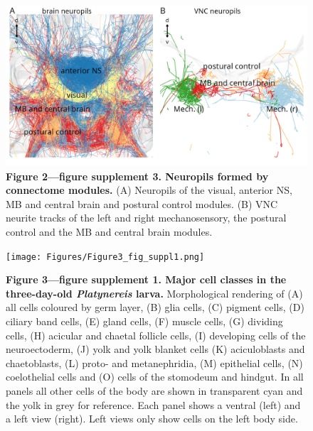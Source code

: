 \documentclass[
  11pt,
]{article}
\begin{document}
\begin{figure}[H]

{\centering \includegraphics[width=1\textwidth,height=\textheight]{Figures/Figure2_fig_suppl3.png}

}

\caption{\textbf{Figure 2---figure supplement 3. Neuropils formed by
connectome modules.} (A) Neuropils of the visual, anterior NS, MB and
central brain and postural control modules. (B) VNC neurite tracks of
the left and right mechanosensory, the postural control and the MB and
central brain modules.}

\end{figure}%

\begin{figure}[H]

{\centering \texttt{[image: Figures/Figure3\_fig\_suppl1.png]}

}

\caption{\textbf{Figure 3---figure supplement 1. Major cell classes in
the three-day-old \emph{Platynereis} larva.} Morphological rendering of
(A) all cells coloured by germ layer, (B) glia cells, (C) pigment cells,
(D) ciliary band cells, (E) gland cells, (F) muscle cells, (G) dividing
cells, (H) acicular and chaetal follicle cells, (I) developing cells of
the neuroectoderm, (J) yolk and yolk blanket cells (K) aciculoblasts and
chaetoblasts, (L) proto- and metanephridia, (M) epithelial cells, (N)
coelothelial cells and (O) cells of the stomodeum and hindgut. In all
panels all other cells of the body are shown in transparent cyan and the
yolk in grey for reference. Each panel shows a ventral (left) and a left
view (right). Left views only show cells on the left body side.}

\end{figure}%
\end{document}
